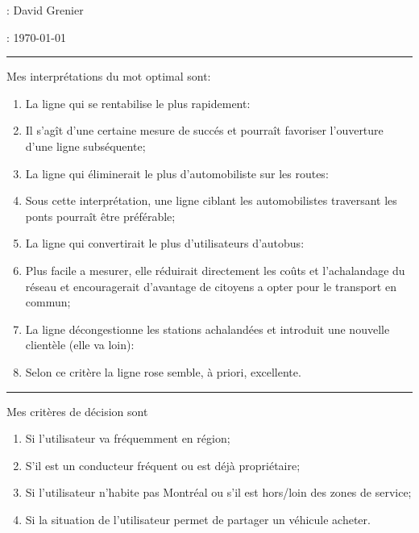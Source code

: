 \documentclass[12pt]{article}
\begin{document}


\medskip
{} : David Grenier

 : \today

\bigskip


\bigskip

\hrule height0.3pt

\bigskip


 Mes interpr\'etations  du mot \og optimal \fg{} sont:
\begin{enumerate}
    \item La ligne qui se rentabilise le plus rapidement:
    \item[] Il s'ag\^it d'une certaine mesure de succ\'es et pourra\^it favoriser l'ouverture d'une ligne subs\'equente;
    \item La ligne qui \'eliminerait le plus d'automobiliste sur les routes:
    \item[] Sous cette interpr\'etation, une ligne ciblant les automobilistes traversant les ponts pourra\^it \^etre pr\'ef\'erable;
    \item La ligne qui convertirait le plus d'utilisateurs d'autobus:
    \item[] Plus facile a mesurer, elle r\'eduirait directement les co\^uts et l'achalandage du r\'eseau et encouragerait d'avantage de citoyens a opter pour le transport en commun;
    \item La ligne d\'econgestionne les stations achaland\'ees et introduit une nouvelle client\`ele (elle va loin):
    \item[] Selon ce crit\`ere la ligne rose semble, \`a priori, excellente.
\end{enumerate}

\bigskip

\hrule height0.3pt

\bigskip

 Mes crit\`eres de d\'ecision sont 
\begin{enumerate}
    \item Si l'utilisateur va fr\'equemment en r\'egion;
    \item S'il est un conducteur fr\'equent ou est d\'ej\`a propri\'etaire;
    \item Si l'utilisateur n'habite pas Montr\'eal ou s'il est hors/loin des zones de service;
    \item Si la situation de l'utilisateur permet de partager un v\'ehicule acheter.
\end{enumerate}
\end{document}
